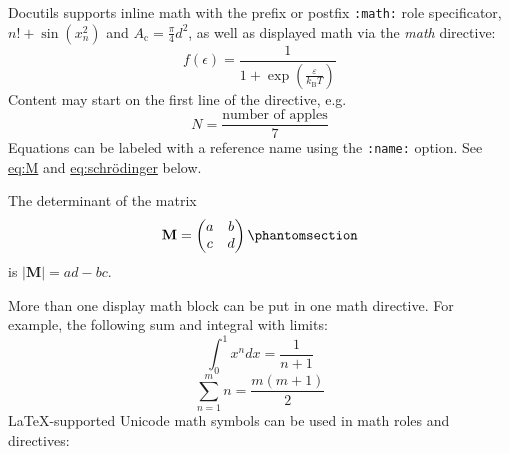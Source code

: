 \documentclass[a4paper]{article}
\providecommand*{\DUroletitlereference}[1]{\textsl{#1}}
\begin{document}
Docutils supports inline math with the prefix or postfix \texttt{:math:}
role specificator, $n! + \sin(x_n^2)$ and $A_\text{c} =
\frac{\pi}{4} d^2$, as well as displayed math via the
\DUroletitlereference{math} directive:
%
\begin{equation*}
f(\epsilon) = \frac{1}{1 + \exp\left(\frac{\varepsilon}{k_\text{B}T}\right)}
\end{equation*}
Content may start on the first line of the directive, e.g.
%
\begin{equation*}
N = \frac{\text{number of apples}}{7}
\end{equation*}
Equations can be labeled with a reference name using the \texttt{:name:} option.
See \hyperref[eq-m]{eq:M} and \hyperref[eq-schrodinger]{eq:schrödinger} below.

The determinant of the matrix
%
\begin{equation*}
\mathbf{M} = \left(\begin{matrix}a&b\\c&d\end{matrix}\right)
\phantomsection
\label{eq-m}
\end{equation*}
is $|\mathbf{M}| = ad - bc$.

More than one display math block can be put in one math directive.
For example, the following sum and integral with limits:
%
\begin{equation*}
\int_0^1 x^n dx = \frac{1}{n + 1}
\end{equation*}%
\begin{equation*}
\sum_{n=1}^m n = \frac{m(m+1)}{2}
\end{equation*}
LaTeX-supported Unicode math symbols can be used in math roles and
directives:
\end{document}
